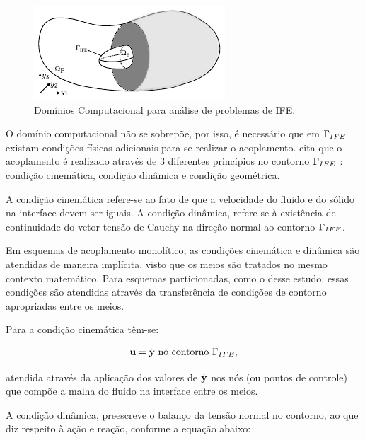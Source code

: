 \documentclass[tese_patricia]{subfiles}
\begin{document}
\begin{figure}[htb!]
	\centering 
	\includegraphics[scale=2.0,trim=0cm 0cm 0cm 0.0cm, clip=true]{Imagens/Cap7/dominioIFE.pdf}	
	\caption{Domínios Computacional para análise de problemas de IFE.}
	\label{fig:dominioIFE}
\end{figure}

O domínio computacional não se sobrepõe, por isso, é necessário que em $\Gamma_{IFE}$ existam condições físicas adicionais para se realizar o acoplamento.  cita que o acoplamento é realizado através de 3 diferentes princípios no contorno $\Gamma_{IFE}$ : condição cinemática, condição dinâmica e condição geométrica.

A condição cinemática refere-se ao fato de que a velocidade do fluido e do sólido na interface devem ser iguais. A condição dinâmica, refere-se à existência de continuidade do vetor tensão de Cauchy na direção normal ao contorno $\Gamma_{IFE}$.

Em esquemas de acoplamento monolítico, as condições cinemática e dinâmica são atendidas de maneira implícita, visto que os meios são tratados no mesmo contexto matemático. Para esquemas particionadas, como o desse estudo, essas condições são atendidas através da transferência de condições de contorno apropriadas entre os meios.

Para a condição cinemática têm-se:

\begin{align}
	\mathbf{u} = \dot{\mathbf{y}} \ \textrm{no contorno} \ \Gamma_{IFE},
\end{align}

\noindent atendida através da aplicação dos valores de $\dot{\mathbf{y}}$ nos nós (ou pontos de controle) que compõe a malha do fluido na interface entre os meios.

A condição dinâmica, preescreve o balanço da tensão normal no contorno, ao que diz respeito à ação e reação, conforme a equação abaixo:
\end{document}

